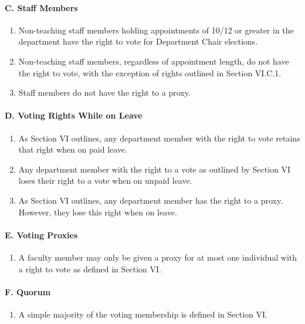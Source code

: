 \documentclass{scrartcl}
\begin{document}
\paragraph{C. Staff Members}


\begin{enumerate}
\item Non-teaching staff members holding appointments of 10/12 or greater in the department have the right to vote for Department Chair elections.
\item Non-teaching staff members, regardless of appointment length, do not have the right to vote, with the exception of rights outlined in Section VI.C.1.
\item Staff members do not have the right to a proxy.

\end{enumerate}
\paragraph{D. Voting Rights While on Leave}


\begin{enumerate}
\item As Section VI outlines, any department member with the right to vote retains that right when on paid leave.
\item Any department member with the right to a vote as outlined by Section VI loses their right to a vote when on unpaid leave.
\item As Section VI outlines, any department member has the right to a proxy. However, they lose this right when on leave.

\end{enumerate}
\paragraph{E. Voting Proxies}


\begin{enumerate}
\item A faculty member may only be given a proxy for at most one individual with a right to vote as defined in Section VI.

\end{enumerate}
\paragraph{F. Quorum}


\begin{enumerate}
\item A simple majority of the voting membership is defined in Section VI.
\end{enumerate}
\end{document}

